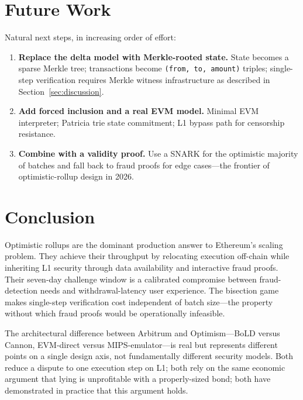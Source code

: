 \documentclass[11pt,letterpaper]{article}
\begin{document}
\section{Future Work}

Natural next steps, in increasing order of effort:

\begin{enumerate}[leftmargin=*, itemsep=2pt]
    \item \textbf{Replace the delta model with Merkle-rooted state.} State becomes a sparse Merkle tree; transactions become \texttt{(from, to, amount)} triples; single-step verification requires Merkle witness infrastructure as described in Section~\ref{sec:discussion}.
    \item \textbf{Add forced inclusion and a real EVM model.} Minimal EVM interpreter; Patricia trie state commitment; L1 bypass path for censorship resistance.
    \item \textbf{Combine with a validity proof.} Use a SNARK for the optimistic majority of batches and fall back to fraud proofs for edge cases---the frontier of optimistic-rollup design in 2026.
\end{enumerate}

\section{Conclusion}

Optimistic rollups are the dominant production answer to Ethereum's scaling problem. They achieve their throughput by relocating execution off-chain while inheriting L1 security through data availability and interactive fraud proofs. Their seven-day challenge window is a calibrated compromise between fraud-detection needs and withdrawal-latency user experience. The bisection game makes single-step verification cost independent of batch size---the property without which fraud proofs would be operationally infeasible.

The architectural difference between Arbitrum and Optimism---BoLD versus Cannon, EVM-direct versus MIPS-emulator---is real but represents different points on a single design axis, not fundamentally different security models. Both reduce a dispute to one execution step on L1; both rely on the same economic argument that lying is unprofitable with a properly-sized bond; both have demonstrated in practice that this argument holds.
\end{document}
